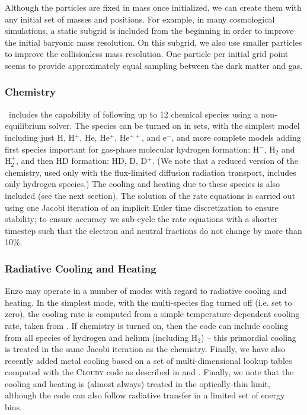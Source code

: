 Although the particles are fixed in mass once initialized, we can
create them with any initial set of masses and positions.  For
example, in many cosmological simulations, a static subgrid is
included from the beginning in order to improve the initial baryonic
mass resolution.  On this subgrid, we also use smaller particles to
improve the collisionless mass resolution.  One particle per initial
grid point seems to provide approximately equal sampling between the
dark matter and gas.

\subsubsection{Chemistry}
\label{sec.ov.chem}

\enzo\ includes the capability of following up to 12 chemical species
using a non-equilibrium solver.  The species can be turned on in sets,
with the simplest model including just H, H$^+$, He, He$^+$, He$^{++}$,
and e$^-$, and more complete models adding first species important for
gas-phase molecular hydrogen formation: H$^-$, H$_2$ and H$_2^+$, and
then HD formation: HD, D, D$^+$.  (We note that a reduced version
of the chemistry, used only with the flux-limited diffusion radiation
transport, includes only hydrogen species.)  The cooling and heating
due to these species is also included (see the next section).  The
solution of the rate equations is carried out using one Jacobi
iteration of an implicit Euler time discretization to ensure
stability; to ensure accuracy we sub-cycle the rate equations with a
shorter timestep such that the electron and neutral fractions do not
change by more than 10\%.

\subsubsection{Radiative Cooling and Heating}

Enzo may operate in a number of modes with regard to radiative cooling
and heating.  In the simplest mode, with the multi-species flag turned
off (i.e. set to zero), the cooling rate is computed from a simple
temperature-dependent cooling rate, taken from \citet{SW87}.  If
chemistry is turned on, then the code can include cooling from all
species of hydrogen and helium (including H$_2$) -- this primordial
cooling is treated in the same Jacobi iteration as the chemistry.
Finally, we have also recently added metal cooling based on a set of
multi-dimensional lookup tables computed with the \textsc{Cloudy} code
\citep{1998PASP..110..761F} as described in
\citet{2008MNRAS.385.1443S} and \citet{2011ApJ...731....6S}.  Finally,
we note that the cooling and heating is (almost always) treated in the
optically-thin limit, although the code can also follow radiative
transfer in a limited set of energy bins.

